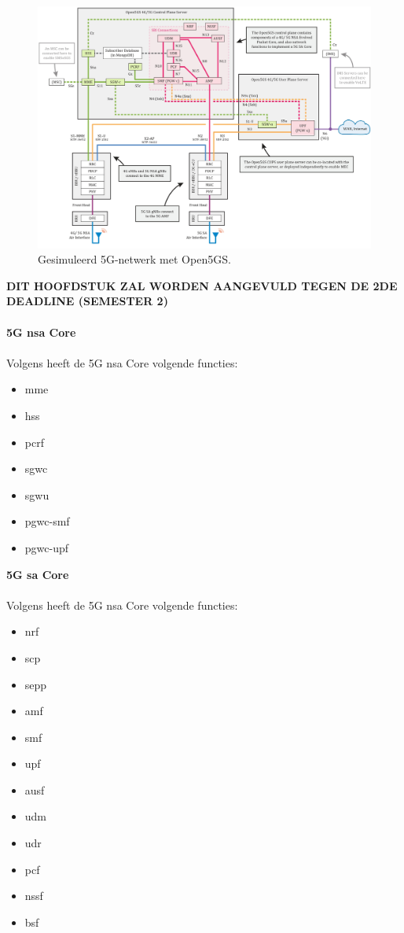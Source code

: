 \begin{figure}[H]
  \includegraphics[width=\linewidth]{../graphics/Open5GS-Schema.jpg}
  \caption{Gesimuleerd 5G-netwerk met Open5GS. \autocite[Door][Copyright 2021 van \citeauthor{Lee2021}]{Lee2021}}
  \label{fig:open5gs-schema}
\end{figure}

\textbf{DIT HOOFDSTUK ZAL WORDEN AANGEVULD TEGEN DE 2DE DEADLINE (SEMESTER 2)}\\\\
\textbf{5G \gls{nsa} Core}\\\\
Volgens \textcite{Lee2025a} heeft de 5G \gls{nsa} Core volgende functies:

\begin{itemize}
  \item \gls{mme}
  \item \gls{hss}
  \item \gls{pcrf}
  \item \gls{sgwc}
  \item \gls{sgwu}
  \item \gls{pgwc-smf}
  \item \gls{pgwc-upf}
\end{itemize}

\textbf{5G \gls{sa} Core}\\\\

Volgens \textcite{Lee2025a} heeft de 5G \gls{nsa} Core volgende functies:

\begin{itemize}
  \item \gls{nrf}
  \item \gls{scp}
  \item \gls{sepp}
  \item \gls{amf}
  \item \gls{smf}
  \item \gls{upf}
  \item \gls{ausf}
  \item \gls{udm}
  \item \gls{udr}
  \item \gls{pcf}
  \item \gls{nssf}
  \item \gls{bsf}
\end{itemize}

